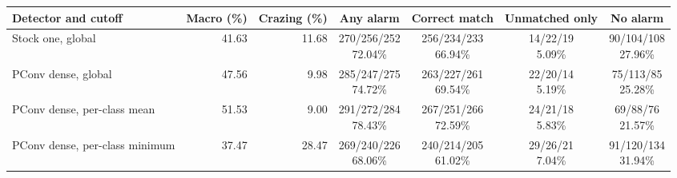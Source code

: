 \begin{tabular}{lrrcccc}\hline
Detector and cutoff & Macro (\%) & Crazing (\%) & Any alarm & Correct match & Unmatched only & No alarm \\ \hline
Stock one, global & 41.63 & 11.68 & \shortstack{270/256/252\\ 72.04\%} & \shortstack{256/234/233\\ 66.94\%} & \shortstack{14/22/19\\ 5.09\%} & \shortstack{90/104/108\\ 27.96\%} \\
PConv dense, global & 47.56 & 9.98 & \shortstack{285/247/275\\ 74.72\%} & \shortstack{263/227/261\\ 69.54\%} & \shortstack{22/20/14\\ 5.19\%} & \shortstack{75/113/85\\ 25.28\%} \\
PConv dense, per-class mean & 51.53 & 9.00 & \shortstack{291/272/284\\ 78.43\%} & \shortstack{267/251/266\\ 72.59\%} & \shortstack{24/21/18\\ 5.83\%} & \shortstack{69/88/76\\ 21.57\%} \\
PConv dense, per-class minimum & 37.47 & 28.47 & \shortstack{269/240/226\\ 68.06\%} & \shortstack{240/214/205\\ 61.02\%} & \shortstack{29/26/21\\ 7.04\%} & \shortstack{91/120/134\\ 31.94\%} \\
\hline\end{tabular}
